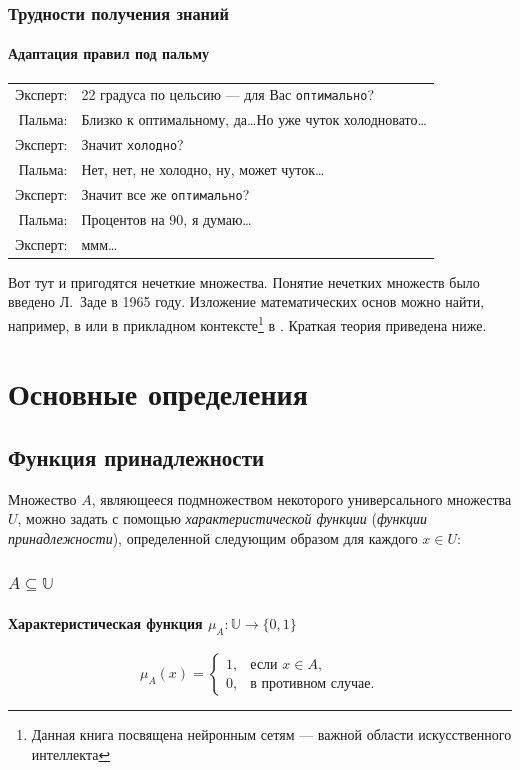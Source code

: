 \begin{frame}[fragile]
    \frametitle{Трудности получения знаний}
    \framesubtitle{Адаптация правил под пальму}
    
    \begin{tabular}{rl}
        \alert{Эксперт:}    & 22 градуса по цельсию --- для Вас \verb"оптимально"?\\
        \alert{Пальма:}     & Близко к оптимальному, да\ldots Но уже чуток холодновато\ldots \\
        \alert{Эксперт:}    & Значит \verb"холодно"?\\
        \alert{Пальма:}     & Нет, нет, не холодно, ну, может чуток\ldots \\
        \alert{Эксперт:}    & Значит все же \verb"оптимально"?\\
        \alert{Пальма:}     & Процентов на 90, я думаю\ldots\\
        \alert{Эксперт:}    & ммм\ldots
    \end{tabular}
\end{frame}

Вот тут и пригодятся нечеткие множества. Понятие нечетких множеств было введено Л.~Заде в 1965 году. Изложение  математических основ можно найти, например, в \cite{bib:gorbatovs:discrmath} или в прикладном контексте\footnote{Данная книга посвящена нейронным сетям --- важной области искусственного интеллекта} в \cite{bib:osovsky:neyro}. Краткая теория приведена ниже.


\section{Основные определения}


\subsection{Функция принадлежности}

Множество $A$, являющееся подмножеством некоторого универсального множества $U$, можно задать с помощью \emph{характеристической функции} (\emph{функции принадлежности}), определенной следующим образом для каждого $x\in U$:
\begin{frame}
    \frametitle{$A\subseteq\mathbb{U}$}
    \framesubtitle{Характеристическая функция $\mu_A:\mathbb{U}\to\{0,1\}$}
    
    \[
        \mu_A(x)=
        \begin{cases}
            1, &\text{если $x\in A$},\\
            0, &\text{в противном случае.}
        \end{cases}
    \]
\end{frame}

